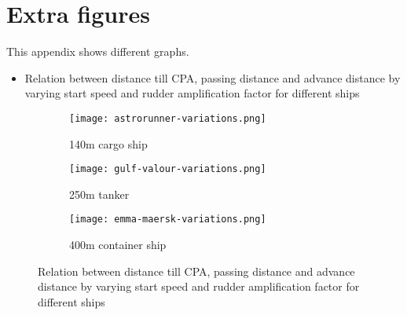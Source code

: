 \chapter{Extra figures}
\label{app:extra-figures}
This appendix shows different graphs.
\begin{itemize}
	\item Relation between distance till CPA, passing distance and advance distance by varying start speed and rudder amplification factor for different ships
\end{itemize}

\begin{figure}[p]
	\centering
	\begin{subfigure}[b]{0.6\textwidth}
		\texttt{[image: astrorunner-variations.png]} 
		\caption{140m cargo ship} 
	\end{subfigure}
	\begin{subfigure}[b]{0.6\linewidth}
		\texttt{[image: gulf-valour-variations.png]} 
		\caption{250m tanker} 
	\end{subfigure}
	\begin{subfigure}[b]{0.6\textwidth}
		\texttt{[image: emma-maersk-variations.png]} 
		\caption{400m container ship} 
	\end{subfigure}

	\caption{Relation between distance till CPA, passing distance and advance distance by varying start speed and rudder amplification factor for different ships} 
	\label{fig:result-advance-distance} 
\end{figure}